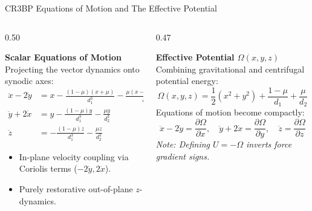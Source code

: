 \documentclass[aspectratio=169, 10pt]{beamer}
\begin{document}
\begin{frame}{CR3BP Equations of Motion and The Effective Potential}
    \begin{columns}[t]
        \begin{column}{0.50\textwidth}
            \begin{block}{\textbf{Scalar Equations of Motion}}
                \scriptsize
                Projecting the vector dynamics onto synodic axes:
                \begin{align*}
                    \ddot{x} - 2\dot{y} &= x - \frac{(1-\mu)(x + \mu)}{d_1^3} - \frac{\mu(x - 1 + \mu)}{d_2^3} \\
                    \ddot{y} + 2\dot{x} &= y - \frac{(1-\mu)y}{d_1^3} - \frac{\mu y}{d_2^3} \\
                    \ddot{z} &= -\frac{(1-\mu)z}{d_1^3} - \frac{\mu z}{d_2^3}
                \end{align*}
                \begin{itemize}\setlength{\itemsep}{1pt}
                    \item In-plane velocity coupling via Coriolis terms ($-2\dot{y}, 2\dot{x}$).
                    \item Purely restorative out-of-plane $z$-dynamics.
                \end{itemize}
            \end{block}
        \end{column}
        
        \begin{column}{0.47\textwidth}
            \begin{block}{\textbf{Effective Potential $\Omega(x,y,z)$}}
                \scriptsize
                Combining gravitational and centrifugal potential energy:
                \begin{equation*}
                    \Omega(x,y,z) = \frac{1}{2}(x^2 + y^2) + \frac{1-\mu}{d_1} + \frac{\mu}{d_2}
                \end{equation*}
                Equations of motion become compactly:
                \begin{equation*}
                    \ddot{x} - 2\dot{y} = \frac{\partial \Omega}{\partial x}, \quad \ddot{y} + 2\dot{x} = \frac{\partial \Omega}{\partial y}, \quad \ddot{z} = \frac{\partial \Omega}{\partial z}
                \end{equation*}
                \textit{Note: Defining $U = -\Omega$ inverts force gradient signs.}
            \end{block}
        \end{column}
    \end{columns}
\end{frame}
\end{document}
